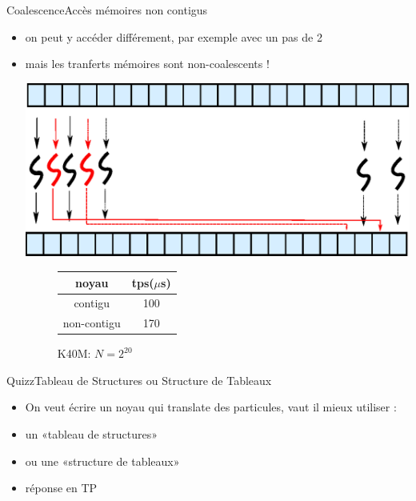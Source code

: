 \documentclass[11pt,mathserif]{beamer}
\newcommand{\galde}{\faQuestion}
\newcommand{\hand}{\faHandORight}
\newcommand{\kontuz}{\faExclamationTriangle}
\newcommand{\pozik}{\faSmileO}
\newcommand{\adibi}{\faCommentO}
\newcommand{\mylang}{C}
\newcommand{\extlang}{c}
\newcommand{\extcu}{cu}
\newcommand{\mylang}{fortran}
\newcommand{\extlang}{f90}
\newcommand{\extcu}{cuf}
\newcommand{\includeSrc}[1]{}
\newcommand{\includeSrcCu}[1]{}
\begin{document}
\begin{frame}{Coalescence}{Accès mémoires non contigus}
  \begin{itemize}[<+->]
    \item[\adibi] on peut y accéder différement, par exemple avec un pas de 2
\begin{center}
  \includeSrcCu{code/scaleFlipAndHalf}
\end{center}
    \item[\kontuz] mais les tranferts mémoires sont non-coalescents !
\begin{minipage}[c]{0.49\linewidth}
  \includegraphics[width=0.9\linewidth]{fig/coalScaleHalf.eps}
\end{minipage}
\begin{minipage}[r]{0.49\linewidth}
  \vspace{1cm}
  \begin{figure}[h]
    \begin{tabular}{|c|c|}
      \hline
      noyau & tps($\mu$s)  \\
      \hline
      contigu & 100 \\
      non-contigu  & 170 \\
      \hline
    \end{tabular}
    \caption{K40M: $N = 2^{20}$}
  \end{figure}
\end{minipage}
  \end{itemize}
\end{frame}

\begin{frame}{Quizz}{Tableau de Structures ou Structure de Tableaux}
  \begin{itemize}[<+->]
    \item[\adibi] On veut écrire un noyau qui translate des particules, vaut il mieux utiliser : 
    \item[\galde] un «tableau de structures»
\begin{center}
  \includeSrc{code/AOS}
\end{center}
    \item[\galde] ou une «structure de tableaux»
\begin{center}
  \includeSrc{code/SOA}
\end{center}
  \item[\hand] réponse en TP \pozik
  \end{itemize}
\end{frame}
\end{document}
